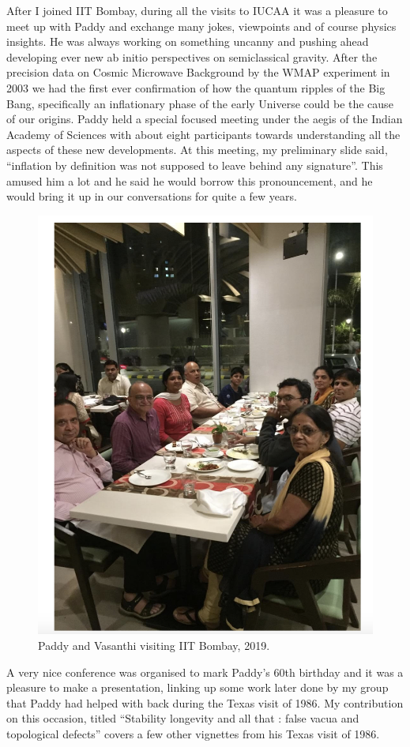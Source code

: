 \documentclass[prd, preprint, longbibliography, 12pt]{revtex4-2}
\begin{document}
After I joined IIT Bombay, during all the visits to IUCAA it was a pleasure to meet up with Paddy and exchange many jokes, viewpoints and of course physics insights. He was always working on something uncanny and pushing ahead developing ever new ab initio perspectives on semiclassical gravity.  After the precision data on Cosmic Microwave Background by the WMAP experiment in 2003 we had the first ever confirmation of how the quantum ripples of the Big Bang, specifically an inflationary phase of the early Universe could be the cause of our origins. Paddy held a special focused meeting under the aegis of the Indian Academy of Sciences with about eight participants towards understanding all the aspects of these new developments. At this meeting, my preliminary slide said, “inflation by definition was not supposed to leave behind any signature”. This amused him a lot and he said he would borrow this pronouncement, and he would bring it up in our conversations for quite a few years. 
\begin{figure}[!h]
\centering
\includegraphics[width=12.00cm]{pviitbombay.png}
\caption*{Paddy and Vasanthi visiting IIT Bombay, 2019.} 
\end{figure}
A very nice conference was organised to mark Paddy’s 60th birthday and it was a pleasure to make a presentation, linking up some work later done by my group that Paddy had helped with back during the Texas visit of 1986. My contribution on this occasion, titled “Stability longevity and all that : false vacua and topological defects” covers a few other vignettes from his Texas visit of 1986.
\end{document}
